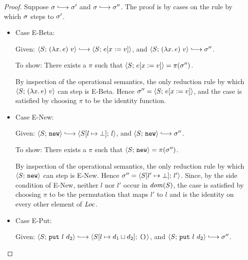 \begin{proof}
  Suppose $\conf \parstepsto \conf'$ and $\conf \parstepsto \conf''$.
  The proof is by cases on the rule by which $\sigma$ steps to
  $\sigma'$.

  \begin{itemize}

  \item Case {\sc E-Beta}:


    Given:
    $\config{S}{\app{(\lam{x}{e})}{v}} \parstepsto \config{S}{\subst{e}{x}{v}}$,
    and $\config{S}{\app{(\lam{x}{e})}{v}} \parstepsto \conf''$.

    To show: There exists a $\pi$ such that
    $\langle S;\, e[x := v] \rangle = \pi(\sigma'')$.

    By inspection of the operational semantics, the only reduction
    rule by which $\langle S;\, (\lambda x.\,e)~v \rangle$ can step is
    {\sc E-Beta}.  Hence $\sigma'' = \langle S;\, e[x := v] \rangle$,
    and the case is satisfied by choosing $\pi$ to be the identity
    function.

  \item Case {\sc E-New}:


    Given:
    $\config{S}{\NEW} \parstepsto \config{\extSRaw{S}{l}{\bot}}{l}$,
    and $\config{S}{\NEW} \parstepsto \conf''$.

    To show: There exists a $\pi$ such that $\langle S;\, \mbox{\texttt{new}} \rangle
    = \pi(\sigma'')$.

    By inspection of the operational semantics, the only reduction
    rule by which $\langle S;\, \mbox{\texttt{new}} \rangle$ can step is {\sc E-New}.  Hence
    $\sigma'' = \langle S[l' \mapsto \bot];\, l' \rangle$.  Since, by the
    side condition of {\sc E-New}, neither $l$ nor $l'$ occur in
    $\mathit{dom}(S)$, the case is satisfied by choosing $\pi$ to be the
    permutation that maps $l'$ to $l$ and is the identity on every
    other element of $\mathit{Loc}$.

  \item Case {\sc E-Put}:


    Given:
    $\config{S}{\putexp{l}{d_2}} \parstepsto \config{\extSRaw{S}{l}{\userlub{d_1}{d_2}}}{\unit}$,
    and $\config{S}{\putexp{l}{d_2}} \parstepsto \conf''$.


\end{itemize}
\end{proof}
